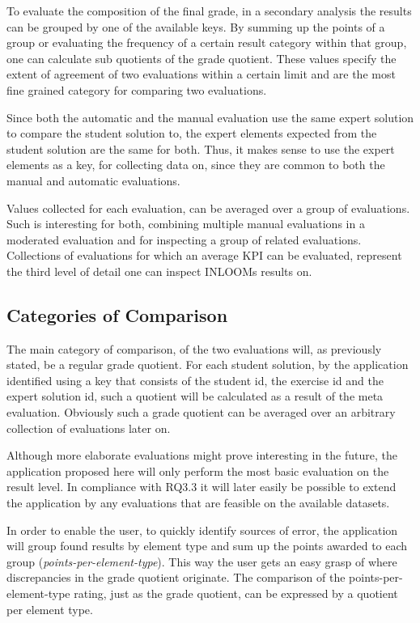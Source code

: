 To evaluate the composition of the final grade, in a secondary analysis the results can be 
grouped by one of the available keys. By summing up the points of a group or evaluating the 
frequency of a certain result category within that group, one can calculate sub quotients of 
the grade quotient. These values specify the extent of agreement of two evaluations within a 
certain limit and are the most fine grained category for comparing two evaluations. 

Since both the automatic and the manual evaluation use the same expert solution to compare
the student solution to, the expert elements expected from the student solution are the 
same for both. Thus, it makes sense to use the expert elements as a key, for collecting data
on, since they are common to both the manual and automatic evaluations. 

Values collected for each evaluation, can be averaged over a group of evaluations. 
Such is interesting for both, combining multiple manual evaluations in a moderated evaluation
and for inspecting a group of related evaluations. Collections of evaluations for which an
average KPI can be evaluated, represent the third level of detail one can inspect INLOOMs 
results on.



\subsection{Categories of Comparison}
\label{CategoriesOfComparison}

The main category of comparison, of the two evaluations will, as previously stated, be a regular
grade quotient. For each student solution, by the application identified using a key that 
consists of the student id, the exercise id and the expert solution id, such a quotient 
will be calculated as a result of the meta evaluation. Obviously such a grade quotient can 
be averaged over an arbitrary collection of evaluations later on.

Although more elaborate evaluations might prove interesting in the future, the application 
proposed here will only perform the most basic evaluation on the result level. In compliance
with RQ3.3 it will later easily be possible to extend the application by any evaluations 
that are feasible on the available datasets. 

In order to enable the user, to quickly identify sources of error, the application will group
found results by element type and sum up the points awarded to each group 
(\textit{points-per-element-type}). This way the user gets an easy grasp of where discrepancies
in the grade quotient originate. The comparison of the points-per-element-type rating, just 
as the grade quotient, can be expressed by a quotient per element type.

